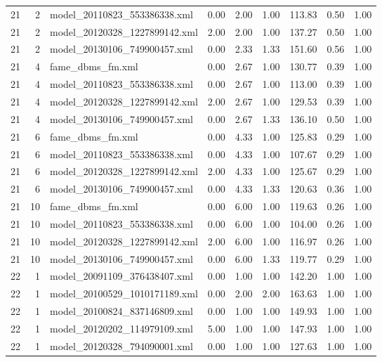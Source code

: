 \begin{table}[ht]
\begin{tabular}{rrlrrrrrr}
   21 &   2 & model\_20110823\_553386338.xml & 0.00 & 2.00 & 1.00 & 113.83 & 0.50 & 1.00 \\ 
   21 &   2 & model\_20120328\_1227899142.xml & 2.00 & 2.00 & 1.00 & 137.27 & 0.50 & 1.00 \\ 
   21 &   2 & model\_20130106\_749900457.xml & 0.00 & 2.33 & 1.33 & 151.60 & 0.56 & 1.00 \\ 
   21 &   4 & fame\_dbms\_fm.xml & 0.00 & 2.67 & 1.00 & 130.77 & 0.39 & 1.00 \\ 
   21 &   4 & model\_20110823\_553386338.xml & 0.00 & 2.67 & 1.00 & 113.00 & 0.39 & 1.00 \\ 
   21 &   4 & model\_20120328\_1227899142.xml & 2.00 & 2.67 & 1.00 & 129.53 & 0.39 & 1.00 \\ 
   21 &   4 & model\_20130106\_749900457.xml & 0.00 & 2.67 & 1.33 & 136.10 & 0.50 & 1.00 \\ 
   21 &   6 & fame\_dbms\_fm.xml & 0.00 & 4.33 & 1.00 & 125.83 & 0.29 & 1.00 \\ 
   21 &   6 & model\_20110823\_553386338.xml & 0.00 & 4.33 & 1.00 & 107.67 & 0.29 & 1.00 \\ 
   21 &   6 & model\_20120328\_1227899142.xml & 2.00 & 4.33 & 1.00 & 125.67 & 0.29 & 1.00 \\ 
   21 &   6 & model\_20130106\_749900457.xml & 0.00 & 4.33 & 1.33 & 120.63 & 0.36 & 1.00 \\ 
   21 &  10 & fame\_dbms\_fm.xml & 0.00 & 6.00 & 1.00 & 119.63 & 0.26 & 1.00 \\ 
   21 &  10 & model\_20110823\_553386338.xml & 0.00 & 6.00 & 1.00 & 104.00 & 0.26 & 1.00 \\ 
   21 &  10 & model\_20120328\_1227899142.xml & 2.00 & 6.00 & 1.00 & 116.97 & 0.26 & 1.00 \\ 
   21 &  10 & model\_20130106\_749900457.xml & 0.00 & 6.00 & 1.33 & 119.77 & 0.29 & 1.00 \\ 
   22 &   1 & model\_20091109\_376438407.xml & 0.00 & 1.00 & 1.00 & 142.20 & 1.00 & 1.00 \\ 
   22 &   1 & model\_20100529\_1010171189.xml & 0.00 & 2.00 & 2.00 & 163.63 & 1.00 & 1.00 \\ 
   22 &   1 & model\_20100824\_837146809.xml & 0.00 & 1.00 & 1.00 & 149.93 & 1.00 & 1.00 \\ 
   22 &   1 & model\_20120202\_114979109.xml & 5.00 & 1.00 & 1.00 & 147.93 & 1.00 & 1.00 \\ 
   22 &   1 & model\_20120328\_794090001.xml & 0.00 & 1.00 & 1.00 & 127.63 & 1.00 & 1.00 \\ 

\end{tabular}
\end{table}
